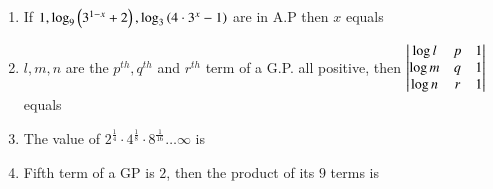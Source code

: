 \documentclass[journal,12pt,twocolumn]{IEEEtran}
\theoremstyle{remark}
\begin{document}
\begin{enumerate}[label={\arabic*.}]
\item {If $ 1, \log_9 \left(3^{1-x} +2\right), \log_3 \left(4\cdot3^x -1\right)$ are in A.P then $x$ equals}
{\hfill{}}
\begin{enumerate}
\end{enumerate}
\item {$l, m, n$ are the $p^{th}, q^{th}$ and $r^{th}$ term of a G.P. all positive, then $\begin{vmatrix}\log l & p & 1 \\ \log m & q & 1 \\ \log n & r & 1 \end{vmatrix}$ equals}
{\hfill{}} 
\begin{enumerate}
\end{enumerate}
\item {The value of $2^{\frac{1}{4}}\cdot 4^{\frac{1}{8}}\cdot 8^{\frac{1}{16}} \ldots \infty$ is}
{\hfill{}} 
\begin{enumerate}
\end{enumerate}
\item {Fifth term of a GP is $2$, then the product of its $9$ terms is}
{\hfill{}}
\begin{enumerate}	
\end{enumerate}


\end{enumerate}
\end{document}
